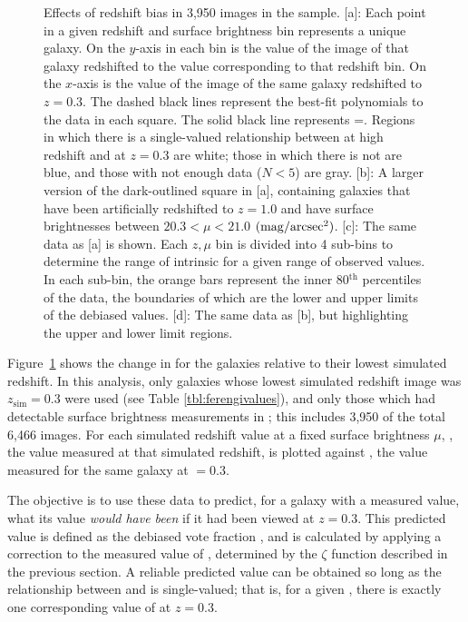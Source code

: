 \documentclass[twocolumn]{aastex6}
\begin{document}
\begin{figure}
\caption{Effects of redshift bias in 3,950 images in the \ferengi{} sample. [a]: Each point in a given redshift and surface brightness bin represents a unique galaxy. On the $y$-axis in each bin is the \ffeatures{} value of the image of that galaxy redshifted to the value corresponding to that redshift bin. On the $x$-axis is the \ffeatures{} value of the image of the same galaxy redshifted to $z=0.3$. The dashed black lines represent the best-fit polynomials to the data in each square. The solid black line represents \ffeaturesz=\ffeaturesrest. Regions in which there is a single-valued relationship between \ffeatures{} at high redshift and at $z=0.3$ are white; those in which there is not are blue, and those with not enough data ($N<5$) are gray. [b]: A larger version of the dark-outlined square in [a], containing \ferengi{} galaxies that have been artificially redshifted to $z=1.0$ and have surface brightnesses between $20.3 < \mu < 21.0$ $\rm (mag/arcsec^2)$. [c]: The same data as [a] is shown. Each $z,\mu$ bin is divided into 4 sub-bins to determine the range of intrinsic \ffeaturesrest{} for a given range of observed \ffeaturesz{} values. In each sub-bin, the orange bars represent the inner 80$^\mathrm{th}$ percentiles of the data, the boundaries of which are the lower and upper limits of the debiased values. [d]: The same data as [b], but highlighting the upper and lower limit regions.}
\label{fig:f_vs_f}
\end{figure}

Figure~\ref{fig:f_vs_f} shows the change in \ffeatures{} for the \ferengi{} galaxies relative to their lowest simulated redshift. In this analysis, only galaxies whose lowest simulated redshift image was $z_\mathrm{sim}=0.3$ were used (see Table \ref{tbl:ferengivalues}), and only those which had detectable surface brightness measurements in \sextractor; this includes 3,950 of the total 6,466 images. For each simulated redshift value \zsim{} at a fixed surface brightness $\mu$, \ffeaturesz, the value measured at that simulated redshift, is plotted against \ffeaturesrest, the value measured for the same galaxy at \zsim$=0.3$. 
 
The objective is to use these data to predict, for a galaxy with a measured \ffeaturesz{} value, what its \ffeatures{} value \emph{would have been} if it had been viewed at $z=0.3$. This predicted value is defined as the debiased vote fraction \ffeaturesdebiased, and is calculated by applying a correction to the measured value of \ffeatures, determined by the $\zeta$ function described in the previous section. A reliable predicted value can be obtained so long as the relationship between \ffeaturesz{} and \ffeaturesrest{} is single-valued; that is, for a given \ffeaturesz, there is exactly one corresponding value of \ffeatures{} at $z=0.3$. 
\end{document}
